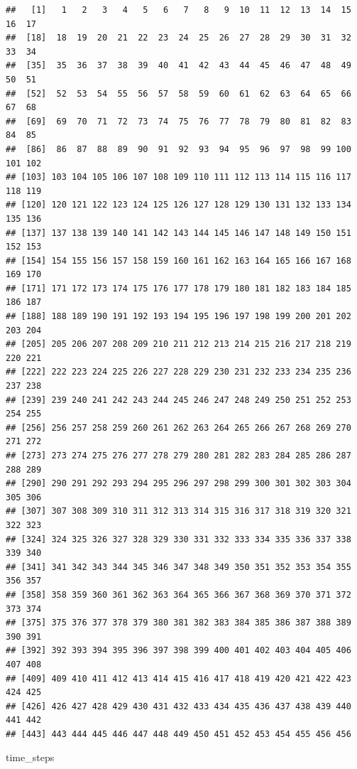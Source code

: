 \documentclass[]{book}
\newenvironment{Shaded}{\begin{snugshade}}{\end{snugshade}}
\newcommand{\NormalTok}[1]{{#1}}
\theoremstyle{definition}
\theoremstyle{definition}
\theoremstyle{remark}
\begin{document}
\begin{verbatim}
##   [1]   1   2   3   4   5   6   7   8   9  10  11  12  13  14  15  16  17
##  [18]  18  19  20  21  22  23  24  25  26  27  28  29  30  31  32  33  34
##  [35]  35  36  37  38  39  40  41  42  43  44  45  46  47  48  49  50  51
##  [52]  52  53  54  55  56  57  58  59  60  61  62  63  64  65  66  67  68
##  [69]  69  70  71  72  73  74  75  76  77  78  79  80  81  82  83  84  85
##  [86]  86  87  88  89  90  91  92  93  94  95  96  97  98  99 100 101 102
## [103] 103 104 105 106 107 108 109 110 111 112 113 114 115 116 117 118 119
## [120] 120 121 122 123 124 125 126 127 128 129 130 131 132 133 134 135 136
## [137] 137 138 139 140 141 142 143 144 145 146 147 148 149 150 151 152 153
## [154] 154 155 156 157 158 159 160 161 162 163 164 165 166 167 168 169 170
## [171] 171 172 173 174 175 176 177 178 179 180 181 182 183 184 185 186 187
## [188] 188 189 190 191 192 193 194 195 196 197 198 199 200 201 202 203 204
## [205] 205 206 207 208 209 210 211 212 213 214 215 216 217 218 219 220 221
## [222] 222 223 224 225 226 227 228 229 230 231 232 233 234 235 236 237 238
## [239] 239 240 241 242 243 244 245 246 247 248 249 250 251 252 253 254 255
## [256] 256 257 258 259 260 261 262 263 264 265 266 267 268 269 270 271 272
## [273] 273 274 275 276 277 278 279 280 281 282 283 284 285 286 287 288 289
## [290] 290 291 292 293 294 295 296 297 298 299 300 301 302 303 304 305 306
## [307] 307 308 309 310 311 312 313 314 315 316 317 318 319 320 321 322 323
## [324] 324 325 326 327 328 329 330 331 332 333 334 335 336 337 338 339 340
## [341] 341 342 343 344 345 346 347 348 349 350 351 352 353 354 355 356 357
## [358] 358 359 360 361 362 363 364 365 366 367 368 369 370 371 372 373 374
## [375] 375 376 377 378 379 380 381 382 383 384 385 386 387 388 389 390 391
## [392] 392 393 394 395 396 397 398 399 400 401 402 403 404 405 406 407 408
## [409] 409 410 411 412 413 414 415 416 417 418 419 420 421 422 423 424 425
## [426] 426 427 428 429 430 431 432 433 434 435 436 437 438 439 440 441 442
## [443] 443 444 445 446 447 448 449 450 451 452 453 454 455 456 456
\end{verbatim}

\begin{Shaded}
\begin{Highlighting}[]
\NormalTok{time_steps }
\end{Highlighting}
\end{Shaded}
\end{document}
